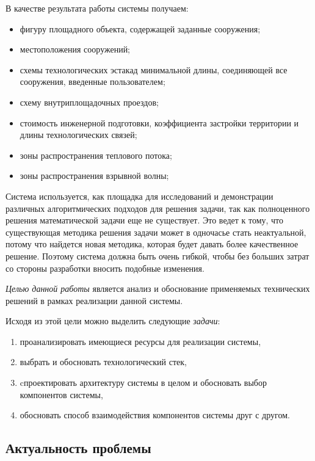\noindent В качестве результата работы системы получаем:
\begin{itemize}
    \item фигуру площадного объекта, содержащей заданные сооружения;
    \item местоположения сооружений;
    \item схемы технологических эстакад минимальной длины, соединяющей все сооружения, введенные пользователем;
    \item схему внутриплощадочных проездов;
    \item стоимость инженерной подготовки, коэффициента застройки территории и длины технологических связей;
    \item зоны распространения теплового потока;
    \item зоны распространения взрывной волны;
\end{itemize}

Система используется, как площадка
для исследований и демонстрации различных алгоритмических подходов для решения задачи,
так как полноценного решения математической задачи еще не существует.
Это ведет к тому, что существующая методика решения задачи может в одночасье стать неактуальной,
потому что найдется новая методика, которая будет давать более качественное решение.
Поэтому система должна быть очень гибкой, чтобы без больших затрат со стороны разработки вносить подобные изменения.


\textit{Целью данной работы} является анализ и обоснование применяемых технических решений в рамках реализации данной
системы.

Исходя из этой цели можно выделить следующие \textit{задачи}:
\begin{enumerate}
    \item проанализировать имеющиеся ресурсы для реализации системы,
    \item выбрать и обосновать технологический стек,
    \item cпроектировать архитектуру системы в целом и обосновать выбор компонентов системы,
    \item обосновать способ взаимодействия компонентов системы друг с другом.
\end{enumerate}


\subsection*{\large{Актуальность проблемы}}

